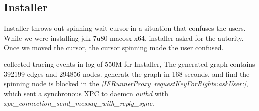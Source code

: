 \subsection{Installer}
Installer throws out spinning wait cursor in a situation
that confuses the users.
While we were installing jdk-7u80-macosx-x64, installer
asked for the autority.
Once we moved the cursor, the cursor spinning made the user
confused. 

\xxx collected tracing events in log of 550M for Installer,
The generated graph contains 392199 edges and 294856 nodes.
\xxx generate the graph in 168 seconds, and find the spinning
node is blocked in the \textit{[IFRunnerProxy\ requestKeyForRights:askUser:]},
which sent a synchronous XPC to daemon \textit{authd} with
\textit{xpc\_connection\_send\_messag\_with\_reply\_sync}.
